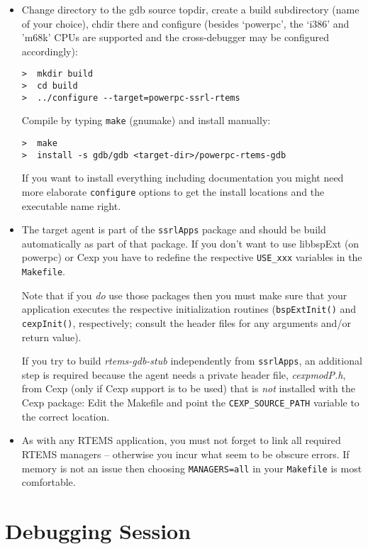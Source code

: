 \documentclass{article}
\begin{document}
\begin{itemize}
\item
  Change directory to the gdb source topdir, create a build
  subdirectory (name of your choice), chdir there and configure
  (besides `powerpc', the `i386' and 'm68k' CPUs are supported and the
  cross-debugger may be configured accordingly):
\begin{verbatim}
>  mkdir build
>  cd build
>  ../configure --target=powerpc-ssrl-rtems  
\end{verbatim}

  Compile by typing {\tt make} (gnumake) and install manually:
\begin{verbatim}
>  make
>  install -s gdb/gdb <target-dir>/powerpc-rtems-gdb
\end{verbatim}

  If you want to install everything including documentation you
  might need more elaborate {\tt configure} options to get the
  install locations and the executable name right.
  
\item
  The target agent is part of the {\tt ssrlApps} package and
  should be build automatically as part of that package.
  If you don't want to use libbspExt (on powerpc) or Cexp
  you have to redefine the respective {\tt USE\_xxx} variables
  in the {\tt Makefile}.

  Note that if you {\em do\/} use those packages then you must
  make sure that your application executes the respective initialization
  routines ({\tt bspExtInit()} and {\tt cexpInit()}, respectively;
  consult the header files for any arguments and/or return value).

  If you try to build {\em rtems-gdb-stub} independently from
  {\tt ssrlApps}, an additional step is required because
  the agent needs a private header file, {\em cexpmodP.h},
  from Cexp (only if Cexp support is to be used) that is {\em not}
  installed with the Cexp package: Edit the Makefile
  and point the {\tt CEXP\_SOURCE\_PATH} variable to the
  correct location.

\item
  As with any RTEMS application, you must not forget to link all
  required RTEMS managers -- otherwise you incur what seem to be
  obscure errors. If memory is not an issue then choosing
  {\tt MANAGERS=all} in your {\tt Makefile} is most comfortable.
  
\end{itemize}

\section{Debugging Session}
\end{document}
